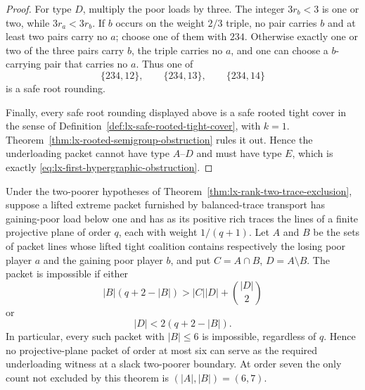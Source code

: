\begin{proof}
For type $D$, multiply the poor loads by three.  The integer
$3r_b<3$ is one or two, while $3r_a<3r_b$.  If $b$ occurs on the weight
$2/3$ triple, no pair carries $b$ and at least two pairs carry no $a$; choose
one of them with $234$.  Otherwise exactly one or two of the three pairs
carry $b$, the triple carries no $a$, and one can choose a $b$-carrying pair
that carries no $a$.  Thus one of
\[
 \{234,12\},\qquad\{234,13\},\qquad\{234,14\}
 \tag{FO-4}\label{eq:lx-type-d-roundings}
\]
is a safe root rounding.

Finally, every safe root rounding displayed above is a safe rooted tight
cover in the sense of Definition~\ref{def:lx-safe-rooted-tight-cover}, with
$k=1$.  Theorem~\ref{thm:lx-rooted-semigroup-obstruction} rules it out.
Hence the underloading packet cannot have type
$A$--$D$ and must have type $E$, which is exactly
\eqref{eq:lx-first-hypergraphic-obstruction}.
\end{proof}

\begin{theorem}
\label{thm:lx-projective-plane-trace-exclusion}
Under the two-poorer hypotheses of
Theorem~\ref{thm:lx-rank-two-trace-exclusion}, suppose a lifted extreme
packet furnished by balanced-trace transport has gaining-poor load below one
and has as its positive rich traces the lines of a finite projective plane of
order $q$, each with weight $1/(q+1)$.  Let $A$ and $B$ be the sets of packet
lines whose lifted tight coalition contains respectively the losing poor
player $a$ and the gaining poor player $b$, and put
$C=A\cap B$, $D=A\setminus B$.  The packet is impossible if either
\[
 |B|(q+2-|B|)>|C||D|+\binom{|D|}{2}                 \tag{PP}
 \label{eq:lx-projective-plane-density}
\]
or
\[
 |D|<2(q+2-|B|).                                    \tag{PP-L}
 \label{eq:lx-projective-plane-local-density}
\]
In particular, every such packet with $|B|\leq6$ is impossible, regardless
of $q$.  Hence no projective-plane packet of order at most six can serve as
the required underloading witness at a slack two-poorer boundary.  At order
seven the only count not excluded by this theorem is $(|A|,|B|)=(6,7)$.
\end{theorem}

